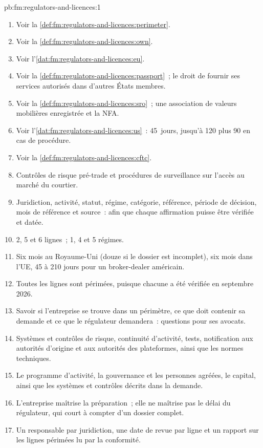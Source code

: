 \begin{solution}{pb:fm:regulators-and-licences:1}
\begin{enumerate}
\item Voir la \cref{def:fm:regulators-and-licences:perimeter}.
\item Voir la \cref{def:fm:regulators-and-licences:own}.
\item Voir l'\cref{dat:fm:regulators-and-licences:eu}.
\item Voir la \cref{def:fm:regulators-and-licences:passport}~; le droit de fournir ses services autorisés dans d'autres États membres.
\item Voir la \cref{def:fm:regulators-and-licences:sro}~; une association de valeurs mobilières enregistrée et la NFA.
\item Voir l'\cref{dat:fm:regulators-and-licences:us}~: 45~jours, jusqu'à 120 plus 90 en cas de procédure.
\item Voir la \cref{def:fm:regulators-and-licences:cftc}.
\item Contrôles de risque pré-trade et procédures de surveillance sur l'accès au marché du courtier.
\item Juridiction, activité, statut, régime, catégorie, référence, période de décision, mois de référence et source~: afin que chaque affirmation puisse être vérifiée
et datée.
\item 2, 5 et 6 lignes~; 1, 4 et 5 régimes.
\item Six mois au Royaume-Uni (douze si le dossier est incomplet), six mois dans l'UE, 45 à 210 jours pour un broker-dealer américain.
\item Toutes les lignes sont périmées, puisque chacune a été vérifiée en septembre 2026.
\item Savoir si l'entreprise se trouve dans un périmètre, ce que doit contenir sa demande et ce que le régulateur demandera~: questions pour ses avocats.
\item Systèmes et contrôles de risque, continuité d'activité, tests, notification aux autorités d'origine et aux autorités des plateformes, ainsi que les normes techniques.
\item Le programme d'activité, la gouvernance et les personnes agréées, le capital, ainsi que les systèmes et contrôles décrits dans la demande.
\item L'entreprise maîtrise la préparation~; elle ne maîtrise pas le délai du régulateur, qui court à compter d'un dossier complet.
\item Un responsable par juridiction, une date de revue par ligne et un rapport sur les lignes périmées lu par la conformité.

\end{enumerate}
\end{solution}
